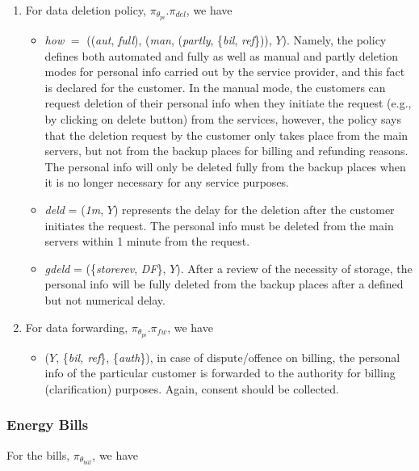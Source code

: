 \documentclass[a4paper]{article}
\begin{document}
\begin{enumerate}
\item For data deletion policy, $\pi_{\theta_{pi}}$.$\pi_{del}$, we have 
\begin{itemize} 
\item \textit{how} $=$ ((\textit{aut}, \textit{full}), (\textit{man}, (\textit{partly}, \{\textit{bil}, \textit{ref}\})), $Y$). Namely, the policy defines both automated and fully as well as manual and partly deletion modes for personal info carried out by the service provider, and this fact is declared for the customer. In the manual mode, the customers can request deletion of their personal info when they initiate the request (e.g., by clicking on delete button) from the services, however, the policy says that the deletion request by the customer only takes place from the main servers, but not from the backup places for billing and refunding reasons. The personal info will only be deleted fully from the backup places when it is no longer necessary for any service purposes.   

\item \textit{deld} = (\textit{1m}, $Y$) represents the delay for the deletion after the customer initiates the request. The personal info must be deleted from the main servers within 1 minute from the request.        

\item \textit{gdeld} = (\{\textit{storerev}, \textit{DF}\}, $Y$). After a review of the necessity of storage, the personal info will be fully deleted from the backup places after a defined but not numerical delay.    
\end{itemize}   

\item For data forwarding, $\pi_{\theta_{pi}}$.$\pi_{fw}$, we have  

\begin{itemize}
\item ($Y$, \{\textit{bil, ref}\}, \{\textit{auth}\}), in case of dispute/offence on billing, the personal info of the particular customer is forwarded to the authority for billing (clarification) purposes. Again, consent should be collected.     
\end{itemize}   
\end{enumerate}

\subsubsection{Energy Bills}  For the bills, $\pi_{\theta_{bill}}$, we have 
\end{document}
